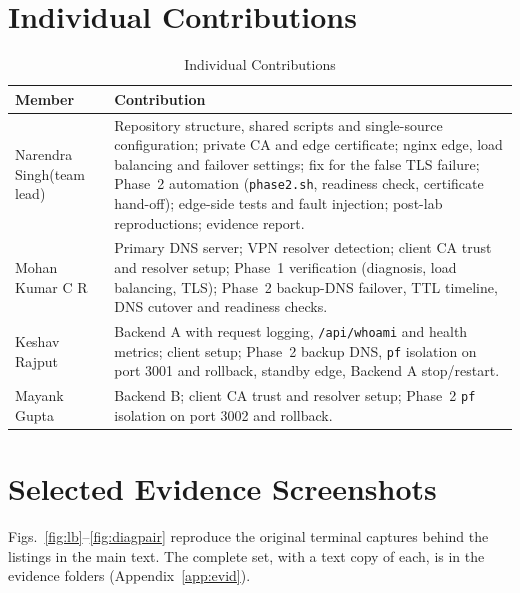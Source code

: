 \documentclass[conference,a4paper]{IEEEtran}
\newcommand{\code}[1]{\texttt{#1}}
\begin{document}
\section{Individual Contributions}
\begin{table}[H]
\caption{Individual Contributions}
\label{tab:contrib}
\centering\footnotesize
\begin{tabularx}{\columnwidth}{@{}P{1.85cm}L@{}}
\toprule
\textbf{Member} & \textbf{Contribution}\\
\midrule
Narendra Singh\newline (team lead) & Repository structure, shared scripts and single-source configuration; private CA and edge certificate; nginx edge, load balancing and failover settings; fix for the false TLS failure; Phase~2 automation (\code{phase2.sh}, readiness check, certificate hand-off); edge-side tests and fault injection; post-lab reproductions; evidence report.\\
\addlinespace
Mohan Kumar C R & Primary DNS server; VPN resolver detection; client CA trust and resolver setup; Phase~1 verification (diagnosis, load balancing, TLS); Phase~2 backup-DNS failover, TTL timeline, DNS cutover and readiness checks.\\
\addlinespace
Keshav Rajput & Backend A with request logging, \code{/api/whoami} and health metrics; client setup; Phase~2 backup DNS, \code{pf} isolation on port 3001 and rollback, standby edge, Backend A stop/restart.\\
\addlinespace
Mayank Gupta & Backend B; client CA trust and resolver setup; Phase~2 \code{pf} isolation on port 3002 and rollback.\\
\bottomrule
\end{tabularx}
\end{table}

\section{Selected Evidence Screenshots}
\label{app:shots}
Figs.~\ref{fig:lb}--\ref{fig:diagpair} reproduce the original terminal captures behind the
listings in the main text. The complete set, with a text copy of each, is in the evidence folders
(Appendix~\ref{app:evid}).
\end{document}
